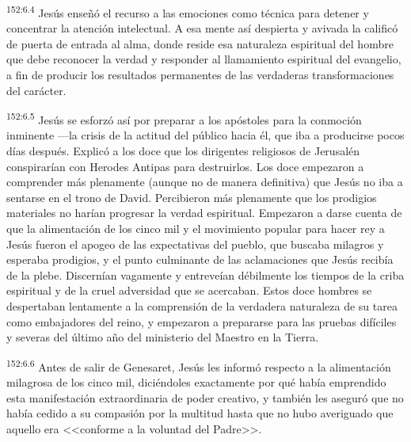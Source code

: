\par 
\textsuperscript{152:6.4} Jesús enseñó el recurso a las emociones como técnica para detener y concentrar la atención intelectual. A esa mente así despierta y avivada la calificó de puerta de entrada al alma, donde reside esa naturaleza espiritual del hombre que debe reconocer la verdad y responder al llamamiento espiritual del evangelio, a fin de producir los resultados permanentes de las verdaderas transformaciones del carácter.

\par 
\textsuperscript{152:6.5} Jesús se esforzó así por preparar a los apóstoles para la conmoción inminente ---la crisis de la actitud del público hacia él, que iba a producirse pocos días después. Explicó a los doce que los dirigentes religiosos de Jerusalén conspirarían con Herodes Antipas para destruirlos. Los doce empezaron a comprender más plenamente (aunque no de manera definitiva) que Jesús no iba a sentarse en el trono de David. Percibieron más plenamente que los prodigios materiales no harían progresar la verdad espiritual. Empezaron a darse cuenta de que la alimentación de los cinco mil y el movimiento popular para hacer rey a Jesús fueron el apogeo de las expectativas del pueblo, que buscaba milagros y esperaba prodigios, y el punto culminante de las aclamaciones que Jesús recibía de la plebe. Discernían vagamente y entreveían débilmente los tiempos de la criba espiritual y de la cruel adversidad que se acercaban. Estos doce hombres se despertaban lentamente a la comprensión de la verdadera naturaleza de su tarea como embajadores del reino, y empezaron a prepararse para las pruebas difíciles y severas del último año del ministerio del Maestro en la Tierra.

\par 
\textsuperscript{152:6.6} Antes de salir de Genesaret, Jesús les informó respecto a la alimentación milagrosa de los cinco mil, diciéndoles exactamente por qué había emprendido esta manifestación extraordinaria de poder creativo, y también les aseguró que no había cedido a su compasión por la multitud hasta que no hubo averiguado que aquello era <<conforme a la voluntad del Padre>>.

